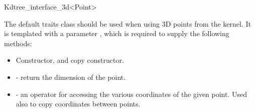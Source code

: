 \begin{ccRefClass}{Kdtree_interface_3d<Point>}

The default traits class  
should be used when using 3D points from the {\cgal} kernel.
It is
templated with a parameter , which is required to
supply the following methods:

\begin{itemize}
    \item Constructor, and copy constructor.

    \item {} - return the dimension of the point.
    
    \item {} - an operator for accessing
    the various coordinates of the given point. Used also to copy
    coordinates between points.
\end{itemize}

\end{ccRefClass}
